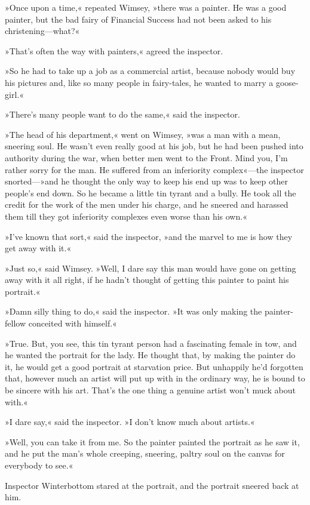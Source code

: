 »Once upon a time,« repeated Wimsey, »there was a painter. He was a good painter, but the bad fairy of Financial Success had not been asked to his christening—what?«

»That's often the way with painters,« agreed the inspector.

»So he had to take up a job as a commercial artist, because nobody would buy his pictures and, like so many people in fairy-tales, he wanted to marry a goose-girl.«

»There's many people want to do the same,« said the inspector.

»The head of his department,« went on Wimsey, »was a man with a mean, sneering soul. He wasn't even really good at his job, but he had been pushed into authority during the war, when better men went to the Front. Mind you, I'm rather sorry for the man. He suffered from an inferiority complex«—the inspector snorted—»and he thought the only way to keep his end up was to keep other people's end down. So he became a little tin tyrant and a bully. He took all the credit for the work of the men under his charge, and he sneered and harassed them till they got inferiority complexes even worse than his own.«

»I've known that sort,« said the inspector, »and the marvel to me is how they get away with it.«

»Just so,« said Wimsey. »Well, I dare say this man would have gone on getting away with it all right, if he hadn't thought of getting this painter to paint his portrait.«

»Damn silly thing to do,« said the inspector. »It was only making the painter-fellow conceited with himself.«

»True. But, you see, this tin tyrant person had a fascinating female in tow, and he wanted the portrait for the lady. He thought that, by making the painter do it, he would get a good portrait at starvation price. But unhappily he'd forgotten that, however much an artist will put up with in the ordinary way, he is bound to be sincere with his art. That's the one thing a genuine artist won't muck about with.«

»I dare say,« said the inspector. »I don't know much about artists.«

»Well, you can take it from me. So the painter painted the portrait as he saw it, and he put the man's whole creeping, sneering, paltry soul on the canvas for everybody to see.«

Inspector Winterbottom stared at the portrait, and the portrait sneered back at him.

